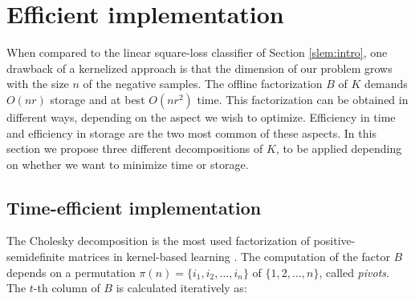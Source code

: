
\section{Efficient implementation}\label{eff_imp}


When compared to the linear square-loss classifier of Section \ref{slem:intro}, one drawback of a kernelized approach is that the dimension of our problem grows with the size $n$ of the negative samples.
The offline factorization $B$ of $K$ demands $O(nr)$ storage and at best $O(nr^2)$ time. This factorization can be obtained in different ways, depending on the aspect we wish to optimize. Efficiency in time and efficiency in storage are the two most common of these aspects. In this section we propose three different decompositions of $K$, to be applied depending on whether we want to minimize time or storage.



\subsection{Time-efficient implementation}
The Cholesky decomposition is the most used factorization of positive-semidefinite matrices in kernel-based learning \cite{BaJo02,BaJo05,FiSc01}. 
The computation of the factor $B$ depends on a permutation $\pi(n) =\{i_1,i_2,\dots,i_n\}$ of $\{1,2,\dots, n\}$, called \textit{pivots}. The $t$-th column of $B$ is calculated iteratively as:

